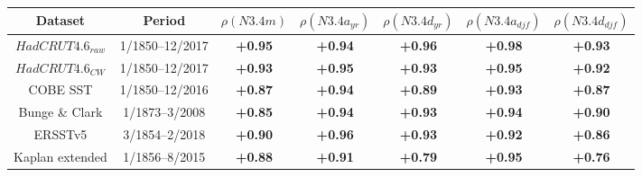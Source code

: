 \begin{tabular}{ccccccc}
 Dataset & Period & $\rho(N3.4m)$ & $\rho(N3.4a_{yr})$ & $\rho(N3.4d_{yr})$ & $\rho(N3.4a_{djf})$ & $\rho(N3.4d_{djf})$ \\
\hline
$HadCRUT4.6_{raw}$ &1/1850--12/2017 &\textbf{+0.95} &\textbf{+0.94} &\textbf{+0.96} &\textbf{+0.98} &\textbf{+0.93}\\
$HadCRUT4.6_{CW}$ &1/1850--12/2017 &\textbf{+0.93} &\textbf{+0.95} &\textbf{+0.93} &\textbf{+0.95} &\textbf{+0.92}\\
COBE SST &1/1850--12/2016 &\textbf{+0.87} &\textbf{+0.94} &\textbf{+0.89} &\textbf{+0.93} &\textbf{+0.87}\\
Bunge \& Clark &1/1873--3/2008 &\textbf{+0.85} &\textbf{+0.94} &\textbf{+0.93} &\textbf{+0.94} &\textbf{+0.90}\\
ERSSTv5 &3/1854--2/2018 &\textbf{+0.90} &\textbf{+0.96} &\textbf{+0.93} &\textbf{+0.92} &\textbf{+0.86}\\
Kaplan extended &1/1856--8/2015 &\textbf{+0.88} &\textbf{+0.91} &\textbf{+0.79} &\textbf{+0.95} &\textbf{+0.76}\\
\end{tabular}
